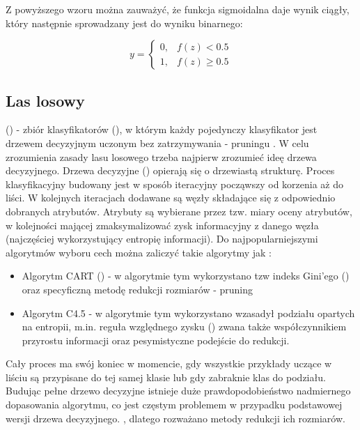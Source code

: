 \newpage
Z powyższego wzoru można zauważyć, że funkcja sigmoidalna daje wynik ciągły, który następnie sprowadzany jest do wyniku binarnego:

\[
y = 
    \begin{cases}
            0,& f(z) < 0.5\\
            1,& f(z) \ge 0.5
    \end{cases}
\]

\newpage
\subsection{Las losowy}
 () - zbiór klasyfikatorów (), w którym każdy pojedynczy klasyfikator jest drzewem decyzyjnym uczonym bez zatrzymywania - pruningu \cite{PPlonski}. W celu zrozumienia zasady lasu losowego trzeba najpierw zrozumieć ideę drzewa decyzyjnego. Drzewa decyzyjne () opierają się o drzewiastą strukturę. Proces klasyfikacyjny budowany jest w sposób iteracyjny począwszy od korzenia aż do liści. W kolejnych iteracjach dodawane są węzły składające się z odpowiednio dobranych atrybutów. Atrybuty są wybierane przez tzw. miary oceny atrybutów, w kolejności mającej zmaksymalizować zysk informacyjny z danego węzła (najczęściej wykorzystujący entropię informacji). Do najpopularniejszymi algorytmów wyboru cech można zaliczyć takie algorytmy jak \cite{DrzewoAlg}:
\begin{itemize}
    \item Algorytm CART () - w algorytmie tym wykorzystano tzw indeks Gini'ego () oraz specyficzną metodę redukcji rozmiarów - pruning
    \item Algorytm C4.5 - w algorytmie tym wykorzystano wzasadył podziału opartych na entropii, m.in. reguła względnego zysku () zwana także współczynnikiem przyrostu informacji oraz pesymistyczne podejście do redukcji.
\end{itemize}
Cały proces ma swój koniec w momencie, gdy wszystkie przykłady uczące w liściu są przypisane do tej samej klasie lub gdy zabraknie klas do podziału. Budując pełne drzewo decyzyjne istnieje duże prawdopodobieństwo nadmiernego dopasowania algorytmu, co jest częstym problemem w przypadku podstawowej wersji drzewa decyzyjnego. \cite{MGrzyb}, dlatego rozważano metody redukcji ich rozmiarów.\\

